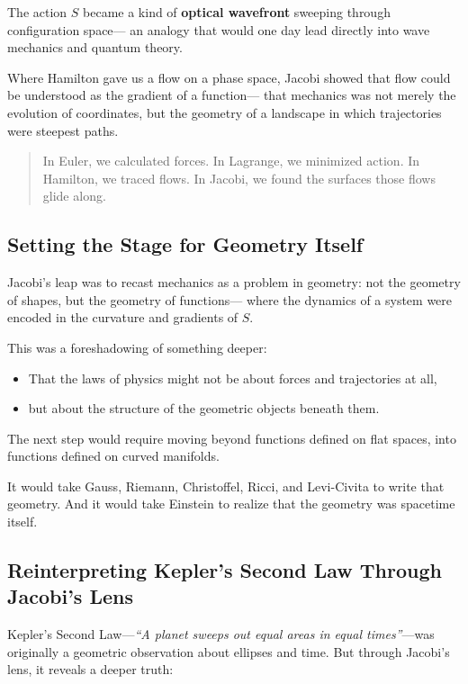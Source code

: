 The action \( S \) became a kind of \textbf{optical wavefront} sweeping through configuration space—  
an analogy that would one day lead directly into wave mechanics and quantum theory.

\bigskip

Where Hamilton gave us a flow on a phase space,  
Jacobi showed that flow could be understood as the gradient of a function—  
that mechanics was not merely the evolution of coordinates, but the geometry of a landscape in which trajectories were steepest paths.

\bigskip

\begin{quote}
In Euler, we calculated forces.  
In Lagrange, we minimized action.  
In Hamilton, we traced flows.  
In Jacobi, we found the surfaces those flows glide along.
\end{quote}

\subsection*{Setting the Stage for Geometry Itself}

Jacobi’s leap was to recast mechanics as a problem in geometry:  
not the geometry of shapes, but the geometry of functions—  
where the dynamics of a system were encoded in the curvature and gradients of \( S \).

This was a foreshadowing of something deeper:

\begin{itemize}
    \item That the laws of physics might not be about forces and trajectories at all,  
    \item but about the structure of the geometric objects beneath them.
\end{itemize}

The next step would require moving beyond functions defined on flat spaces,  
into functions defined on curved manifolds.

It would take Gauss, Riemann, Christoffel, Ricci, and Levi-Civita to write that geometry.  
And it would take Einstein to realize that the geometry was spacetime itself.

\subsection*{Reinterpreting Kepler’s Second Law Through Jacobi’s Lens}

Kepler’s Second Law—\textit{``A planet sweeps out equal areas in equal times''}—was originally a geometric observation about ellipses and time.  
But through Jacobi’s lens, it reveals a deeper truth:  

